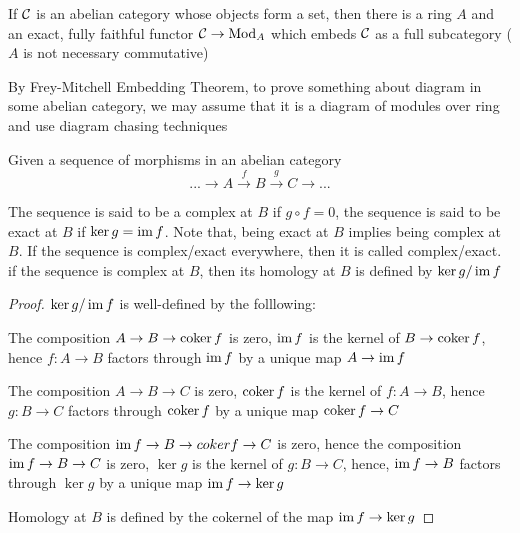 \begin{theorem}
	If $\mathcal{C}$ is an abelian category whose objects form a set, then there is a ring $A$ and an exact, fully faithful functor $\mathcal{C} \to \operatorname{Mod}_A$ which embeds $\mathcal{C}$ as a full subcategory ($A$ is not necessary commutative)
\end{theorem}

By Frey-Mitchell Embedding Theorem, to prove something about diagram in some abelian category, we may assume that it is a diagram of modules over ring and use diagram chasing techniques

\begin{definition}
	Given a sequence of morphisms in an abelian category
	$$
	... \to A \xrightarrow{f} B \xrightarrow{g} C \to ...
	$$
	
	The sequence is said to be a complex at $B$ if $g \circ f = 0$, the sequence is said to be exact at $B$ if $\ker g = \operatorname{im} f$. Note that, being exact at $B$ implies being complex at $B$. If the sequence is complex/exact everywhere, then it is called complex/exact. if the sequence is complex at $B$, then its homology at $B$ is defined by $\ker g / \operatorname{im} f$
\end{definition}

\begin{proof}
	$\ker g / \operatorname{im} f$ is well-defined by the folllowing:
	\begin{center}
	\end{center}
	
	The composition $A \to B \to \operatorname{coker} f$ is zero, $\operatorname{im} f$ is the kernel of $B \to \operatorname{coker} f$, hence $f: A \to B$ factors through $\operatorname{im} f$ by a unique map $A \to \operatorname{im} f$
	
	The composition $A \to B \to C$ is zero, $\operatorname{coker} f$ is the kernel of $f: A \to B$, hence $g: B \to C$ factors through $\operatorname{coker} f$ by a unique map $\operatorname{coker} f \to C$
	
	The composition $\operatorname{im} f \to B \to coker f \to C$ is zero, hence the composition $\operatorname{im} f \to B \to C$ is zero, $\ker g$ is the kernel of $g: B \to C$, hence, $\operatorname{im} f \to B$ factors through $\ker g$ by a unique map $\operatorname{im} f \to \ker g$
	
	Homology at $B$ is defined by the cokernel of the map $\operatorname{im} f \to \ker g$
\end{proof}


